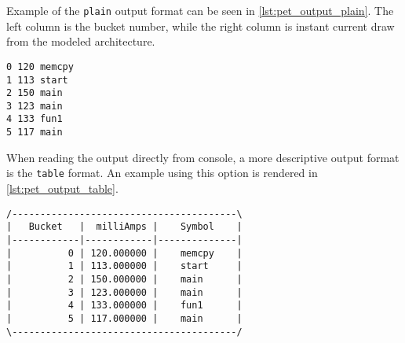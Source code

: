 Example of the \texttt{plain} output format can be seen in
\autoref{lst:pet_output_plain}. The left column is the bucket number, while the
right column is instant current draw from the modeled architecture.

\begin{lstlisting}[numbers=none,float=hbt,label={lst:pet_output_plain},caption={PET plain output with function annotations.}]
0 120 memcpy
1 113 start
2 150 main
3 123 main
4 133 fun1
5 117 main
\end{lstlisting}

When reading the output directly from console, a more descriptive output format
is the \texttt{table} format. An example using this option is rendered in
\autoref{lst:pet_output_table}.

\begin{lstlisting}[numbers=none,float=hbt,label={lst:pet_output_table},caption={PET table output with function annotations.}]
/----------------------------------------\
|   Bucket   |  milliAmps |    Symbol    |
|------------|------------|--------------|
|          0 | 120.000000 |    memcpy    |
|          1 | 113.000000 |    start     |
|          2 | 150.000000 |    main      |
|          3 | 123.000000 |    main      |
|          4 | 133.000000 |    fun1      |
|          5 | 117.000000 |    main      |
\----------------------------------------/
\end{lstlisting}


